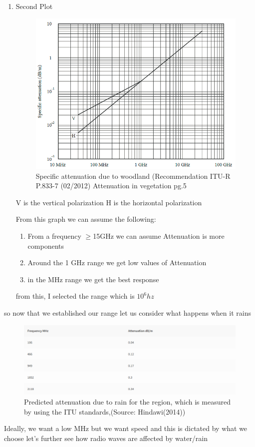 \begin{enumerate}
	\item Second Plot
\begin{figure}[h!]
		\centering
		\includegraphics[width=0.5\linewidth]{Images/ITU attteuntion.png}
		\caption{Specific attenuation due to woodland (Recommendation ITU-R P.833-7 (02/2012) Attenuation in vegetation pg.5}
		\label{Specific attenuation due to woodland (Recommendation ITU-R P.833-7 (02/2012) Attenuation in vegetation pg.5}
		\end{figure}
	V is the vertical polarization
	H is the horizontal polarization

	From this graph we  can assume the following:
	\begin{enumerate}
		\item From a frequency $\ge$15GHz we can assume Attenuation is more components
		\item Around the 1 GHz range we  get low values of Attenuation
		\item in the  MHz range we get the best response
	\end{enumerate}
	from this, I selected the  range which is  $10^6 hz$
	
\end{enumerate}
\newpage
so now that  we  established our range let us consider  what happens when it rains

\cite{Sabetahd_Mousavi_Ghasemi_Vafaei_Poursorkhabi_Mohammadzadeh_Zandi_2022}

\begin{figure}[h!]
	\begin{center}
		
	\includegraphics[width=\linewidth]{Images/atteuntion_2.png}\par
	\caption{Predicted attenuation due to rain for the region, which is measured by using the ITU standards,(Source: Hindawi(2014))}
	\label{Predicted attenuation due to rain for the region, which is measured by using the ITU standards,(source: Hindawi(2014))}
		\end{center}
\end{figure}
Ideally, we want a low MHz but we want speed and this  is dictated by what we choose let's further see how radio waves are affected by water/rain

